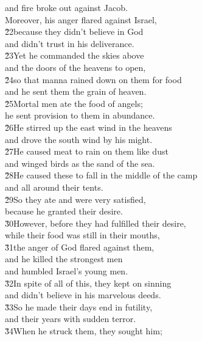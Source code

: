 \begin{poetry}
\poemll    and fire broke out against Jacob. \\
\poeml Moreover, his anger flared against Israel, \\
\poeml \v{22}because they didn't believe in God \\
\poemlll       and didn't trust in his deliverance. \\
\poeml \v{23}Yet he commanded the skies above \\
\poemll    and the doors of the heavens to open, \\
\poeml \v{24}so that manna rained down on them for food \\
\poemll    and he sent them the grain of heaven. \\
\poeml \v{25}Mortal men ate the food of angels; \\
\poemll    he sent provision to them in abundance. \\
\poeml \v{26}He stirred up the east wind in the heavens \\
\poemll    and drove the south wind by his might. \\
\poeml \v{27}He caused meat to rain on them like dust \\
\poemll    and winged birds as the sand of the sea. \\
\poeml \v{28}He caused these to fall in the middle of the camp \\
\poemll    and all around their tents. \\
\poeml \v{29}So they ate and were very satisfied, \\
\poemll    because he granted their desire. \\
\poeml \v{30}However, before they had fulfilled their desire, \\
\poemll    while their food was still in their mouths, \\
\poeml \v{31}the anger of God flared against them, \\
\poemll    and he killed the strongest men \\
\poemlll       and humbled Israel's young men. \\
\poeml \v{32}In spite of all of this, they kept on sinning \\
\poemll    and didn't believe in his marvelous deeds. \\
\poeml \v{33}So he made their days end in futility, \\
\poemll    and their years with sudden terror. \\
\poeml \v{34}When he struck them, they sought him; \\

\end{poetry}
